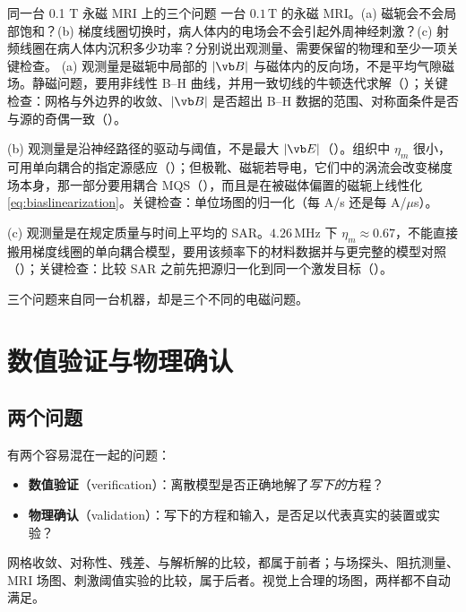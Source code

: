\begin{example}[label=ex:practice-workflow]{同一台 0.1 T 永磁 MRI 上的三个问题}
一台 $0.1\,\mathrm T$ 的永磁 MRI。(a) 磁轭会不会局部饱和？(b) 梯度线圈切换时，病人体内的电场会不会引起外周神经刺激？(c) 射频线圈在病人体内沉积多少功率？分别说出观测量、需要保留的物理和至少一项关键检查。
\solution
(a) 观测量是磁轭中局部的 $|\vb B|$ 与磁体内的反向场，不是平均气隙磁场。静磁问题，要用非线性 B--H 曲线，并用一致切线的牛顿迭代求解（）；关键检查：网格与外边界的收敛、$|\vb B|$ 是否超出 B--H 数据的范围、对称面条件是否与源的奇偶一致（）。

(b) 观测量是沿神经路径的驱动与阈值，不是最大 $|\vb E|$（）。组织中 $\eta_m$ 很小，可用单向耦合的指定源感应（）；但极靴、磁轭若导电，它们中的涡流会改变梯度场本身，那一部分要用耦合 MQS（），而且是在被磁体偏置的磁轭上线性化 \eqref{eq:biaslinearization}。关键检查：单位场图的归一化（每 A/s 还是每 A/$\mu$s）。

(c) 观测量是在规定质量与时间上平均的 SAR。$4.26\,\mathrm{MHz}$ 下 $\eta_m\approx0.67$，不能直接搬用梯度线圈的单向耦合模型，要用该频率下的材料数据并与更完整的模型对照（）；关键检查：比较 SAR 之前先把源归一化到同一个激发目标（）。

三个问题来自同一台机器，却是三个不同的电磁问题。
\end{example}

\section{数值验证与物理确认}\label{sec:practice-vv}

\subsection{两个问题}
有两个容易混在一起的问题\cite{oberkampf}：
\begin{itemize}
\item \textbf{数值验证}（verification）：离散模型是否正确地解了\emph{写下的}方程？
\item \textbf{物理确认}（validation）：写下的方程和输入，是否足以代表真实的装置或实验？
\end{itemize}
网格收敛、对称性、残差、与解析解的比较，都属于前者；与场探头、阻抗测量、MRI 场图、刺激阈值实验的比较，属于后者。视觉上合理的场图，两样都不自动满足。


